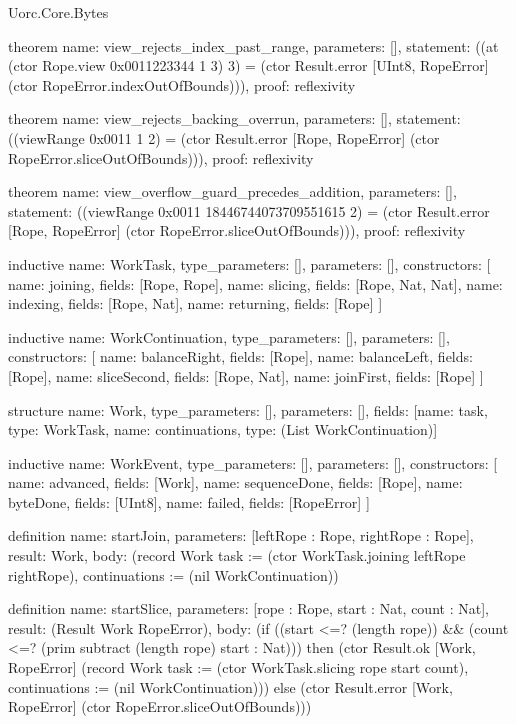 \begin{lexlean}{Uorc.Core.Bytes}
\begin{semanticmodule}
theorem{
  name: view_rejects_index_past_range,
  parameters: [],
  statement: ((at (ctor Rope.view 0x0011223344 1 3) 3) = (ctor Result.error [UInt8, RopeError] (ctor RopeError.indexOutOfBounds))),
  proof: reflexivity{}
}

theorem{
  name: view_rejects_backing_overrun,
  parameters: [],
  statement: ((viewRange 0x0011 1 2) = (ctor Result.error [Rope, RopeError] (ctor RopeError.sliceOutOfBounds))),
  proof: reflexivity{}
}

theorem{
  name: view_overflow_guard_precedes_addition,
  parameters: [],
  statement: ((viewRange 0x0011 18446744073709551615 2) = (ctor Result.error [Rope, RopeError] (ctor RopeError.sliceOutOfBounds))),
  proof: reflexivity{}
}

inductive{
  name: WorkTask,
  type_parameters: [],
  parameters: [],
  constructors: [
    {name: joining, fields: [Rope, Rope]},
    {name: slicing, fields: [Rope, Nat, Nat]},
    {name: indexing, fields: [Rope, Nat]},
    {name: returning, fields: [Rope]}
  ]
}

inductive{
  name: WorkContinuation,
  type_parameters: [],
  parameters: [],
  constructors: [
    {name: balanceRight, fields: [Rope]},
    {name: balanceLeft, fields: [Rope]},
    {name: sliceSecond, fields: [Rope, Nat]},
    {name: joinFirst, fields: [Rope]}
  ]
}

structure{
  name: Work,
  type_parameters: [],
  parameters: [],
  fields: [{name: task, type: WorkTask}, {name: continuations, type: (List WorkContinuation)}]
}

inductive{
  name: WorkEvent,
  type_parameters: [],
  parameters: [],
  constructors: [
    {name: advanced, fields: [Work]},
    {name: sequenceDone, fields: [Rope]},
    {name: byteDone, fields: [UInt8]},
    {name: failed, fields: [RopeError]}
  ]
}

definition{
  name: startJoin,
  parameters: [leftRope : Rope, rightRope : Rope],
  result: Work,
  body: (record Work {task := (ctor WorkTask.joining leftRope rightRope), continuations := (nil WorkContinuation)})
}

definition{
  name: startSlice,
  parameters: [rope : Rope, start : Nat, count : Nat],
  result: (Result Work RopeError),
  body: (if ((start <=? (length rope)) && (count <=? (prim subtract (length rope) start : Nat))) then (ctor Result.ok [Work, RopeError] (record Work {task := (ctor WorkTask.slicing rope start count), continuations := (nil WorkContinuation)})) else (ctor Result.error [Work, RopeError] (ctor RopeError.sliceOutOfBounds)))
}


\end{semanticmodule}
\end{lexlean}

